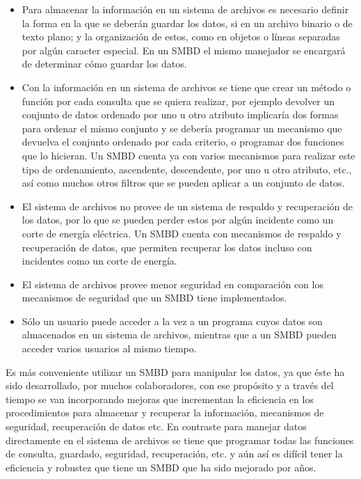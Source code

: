 \documentclass{exam}
\begin{document}
\begin{questions}
	\question 
	\begin{itemize}
		\item Para almacenar la información en un sistema de archivos es necesario definir la forma en la que se deberán guardar los datos, si en un archivo binario o de texto plano; y la organización de estos, como en objetos o líneas separadas por algún caracter especial. En un SMBD el mismo manejador se encargará de determinar cómo guardar los datos.
		\item Con la información en un sistema de archivos se tiene que crear un método o función por cada consulta que se quiera realizar, por ejemplo devolver un conjunto de datos ordenado por uno u otro atributo implicaría dos formas para ordenar el mismo conjunto y se debería programar un mecanismo que devuelva el conjunto ordenado por cada criterio, o programar dos funciones que lo hicieran. Un SMBD cuenta ya con varios mecanismos para realizar este tipo de ordenamiento, ascendente, descendente, por uno u otro atributo, etc., así como muchos otros filtros que se pueden aplicar a un conjunto de datos.
		\item El sistema de archivos no provee de un sistema de respaldo y recuperación de los datos, por lo que se pueden perder estos por algún incidente como un corte de energía eléctrica. Un SMBD cuenta con mecanismos de respaldo y recuperación de datos, que permiten recuperar los datos incluso con incidentes como un corte de energía.
		\item El sistema de archivos provee menor seguridad en comparación con los mecanismos de seguridad que un SMBD tiene implementados.
		\item Sólo un usuario puede acceder a la vez a un programa cuyos datos son almacenados en un sistema de archivos, mientras que a un SMBD pueden acceder varios usuarios al mismo tiempo.
		
	\end{itemize}
	
	\question Es más conveniente utilizar un SMBD para manipular los datos, ya que éste ha sido desarrollado, por muchos colaboradores, con ese propósito y a través del tiempo se van incorporando mejoras que incrementan la eficiencia en los procedimientos para almacenar y recuperar la información, mecanismos de seguridad, recuperación de datos etc. En contraste para manejar datos directamente en el sistema de archivos se tiene que programar todas las funciones de consulta, guardado, seguridad, recuperación, etc. y aún así es difícil tener la eficiencia y robustez que tiene un SMBD que ha sido mejorado por años.
	
\end{questions}
\end{document}
